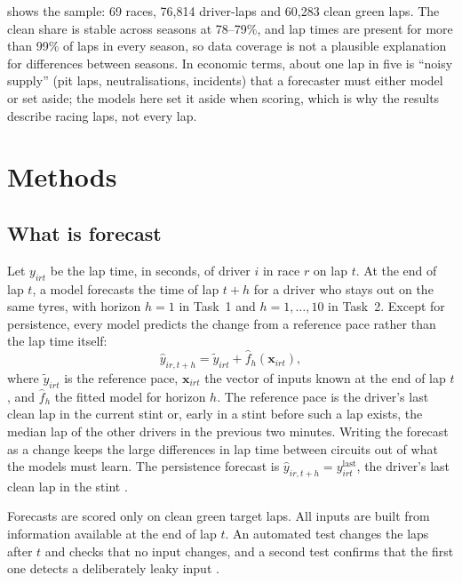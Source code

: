 \documentclass[12pt]{article}
\begin{document}
 shows the sample: 69 races, 76,814 driver-laps and 60,283 clean green laps. The clean share is stable
across seasons at 78--79\%, and lap times are present for more than 99\% of laps in every season, so data coverage is
not a plausible explanation for differences between seasons. In economic terms, about one lap in five is ``noisy
supply'' (pit laps, neutralisations, incidents) that a forecaster must either model or set aside; the models here set it
aside when scoring, which is why the results describe racing laps, not every lap.

\section{Methods}\label{sec:methods}

\subsection{What is forecast}\label{sec:target}

Let $y_{irt}$ be the lap time, in seconds, of driver $i$ in race $r$ on lap $t$. At the end of lap $t$, a model forecasts
the time of lap $t+h$ for a driver who stays out on the same tyres, with horizon $h=1$ in Task~1 and $h=1,\dots,10$ in
Task~2. Except for persistence, every model predicts the change from a reference pace rather than the lap time itself:
\begin{equation}\label{eq:target}
  \hat y_{ir,t+h} = \tilde y_{irt} + \hat f_h\!\left(\mathbf{x}_{irt}\right),
\end{equation}
where $\tilde y_{irt}$ is the reference pace, $\mathbf{x}_{irt}$ the vector of inputs known at the end of lap $t$, and
$\hat f_h$ the fitted model for horizon $h$. The reference pace is the driver's last clean lap in the current stint or,
early in a stint before such a lap exists, the median lap of the other drivers in the previous two minutes. Writing the
forecast as a change keeps the large differences in lap time between circuits out of what the models must learn. The persistence forecast is $\hat y_{ir,t+h}=y^{\text{last}}_{irt}$, the driver's last clean lap in the
stint \parencite{hyndman2021}.

Forecasts are scored only on clean green target laps. All inputs are built from information available at the end of lap
$t$. An automated test changes the laps after $t$ and checks that no input changes, and a second test confirms that the
first one detects a deliberately leaky input \parencite{kaufman2012}.
\end{document}
